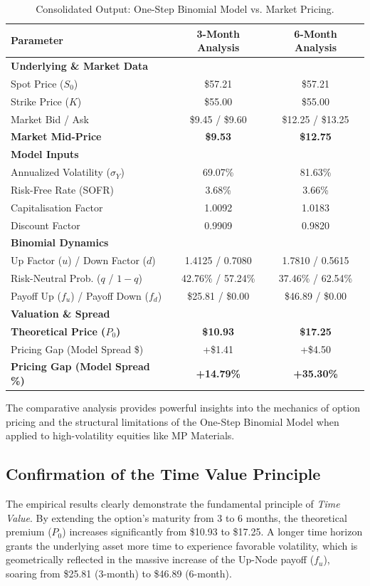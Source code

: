 \documentclass{report}
\begin{document}
\begin{table}[h]
\centering
\begin{tabular}{lcc}
\toprule
\textbf{Parameter} & \textbf{3-Month Analysis} & \textbf{6-Month Analysis} \\
\midrule
\textbf{Underlying \& Market Data} & & \\
Spot Price ($S_0$) & \$57.21 & \$57.21 \\
Strike Price ($K$) & \$55.00 & \$55.00 \\
Market Bid / Ask & \$9.45 / \$9.60 & \$12.25 / \$13.25 \\
\textbf{Market Mid-Price} & \textbf{\$9.53} & \textbf{\$12.75} \\
\midrule
\textbf{Model Inputs} & & \\
Annualized Volatility ($\sigma_Y$) & 69.07\% & 81.63\% \\
Risk-Free Rate (SOFR) & 3.68\% & 3.66\% \\
Capitalisation Factor & 1.0092 & 1.0183 \\
Discount Factor & 0.9909 & 0.9820 \\
\midrule
\textbf{Binomial Dynamics} & & \\
Up Factor ($u$) / Down Factor ($d$) & 1.4125 / 0.7080 & 1.7810 / 0.5615 \\
Risk-Neutral Prob. ($q$ / $1-q$) & 42.76\% / 57.24\% & 37.46\% / 62.54\% \\
Payoff Up ($f_u$) / Payoff Down ($f_d$) & \$25.81 / \$0.00 & \$46.89 / \$0.00 \\
\midrule
\textbf{Valuation \& Spread} & & \\
\textbf{Theoretical Price ($P_0$)} & \textbf{\$10.93} & \textbf{\$17.25} \\
Pricing Gap (Model Spread \$) & +\$1.41 & +\$4.50 \\
\textbf{Pricing Gap (Model Spread \%)} & \textbf{+14.79\%} & \textbf{+35.30\%} \\
\bottomrule
\end{tabular}
\caption{Consolidated Output: One-Step Binomial Model vs. Market Pricing.}
\label{tab:results}
\end{table}

The comparative analysis provides powerful insights into the mechanics of option pricing and the structural limitations of the One-Step Binomial Model when applied to high-volatility equities like MP Materials.

\subsection{Confirmation of the Time Value Principle}
The empirical results clearly demonstrate the fundamental principle of \textit{Time Value}. By extending the option's maturity from 3 to 6 months, the theoretical premium ($P_0$) increases significantly from \$10.93 to \$17.25. A longer time horizon grants the underlying asset more time to experience favorable volatility, which is geometrically reflected in the massive increase of the Up-Node payoff ($f_u$), soaring from \$25.81 (3-month) to \$46.89 (6-month).
\end{document}
